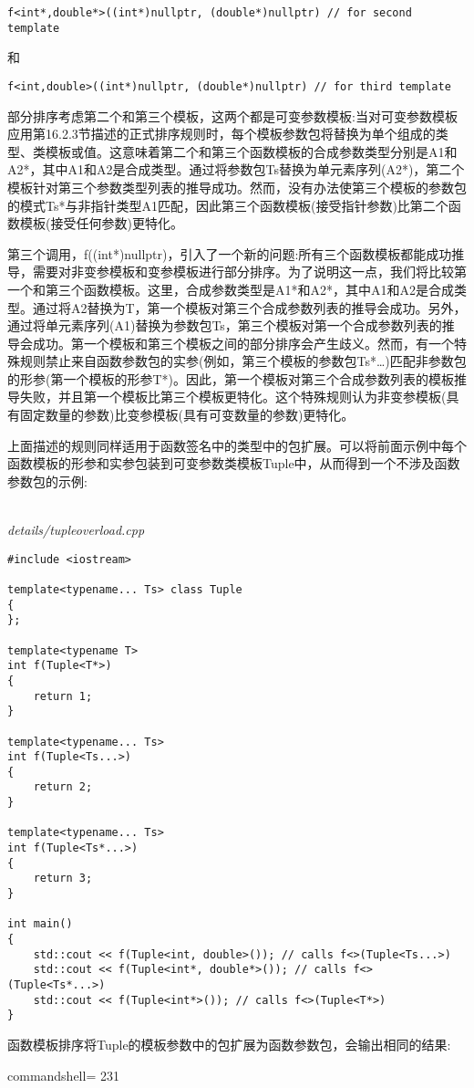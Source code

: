 \begin{lstlisting}[style=styleCXX]
f<int*,double*>((int*)nullptr, (double*)nullptr) // for second template
\end{lstlisting}

和

\begin{lstlisting}[style=styleCXX]
f<int,double>((int*)nullptr, (double*)nullptr) // for third template
\end{lstlisting}

部分排序考虑第二个和第三个模板，这两个都是可变参数模板:当对可变参数模板应用第16.2.3节描述的正式排序规则时，每个模板参数包将替换为单个组成的类型、类模板或值。这意味着第二个和第三个函数模板的合成参数类型分别是A1和A2*，其中A1和A2是合成类型。通过将参数包Ts替换为单元素序列(A2*)，第二个模板针对第三个参数类型列表的推导成功。然而，没有办法使第三个模板的参数包的模式Ts*与非指针类型A1匹配，因此第三个函数模板(接受指针参数)比第二个函数模板(接受任何参数)更特化。

第三个调用，f((int*)nullptr)，引入了一个新的问题:所有三个函数模板都能成功推导，需要对非变参模板和变参模板进行部分排序。为了说明这一点，我们将比较第一个和第三个函数模板。这里，合成参数类型是A1*和A2*，其中A1和A2是合成类型。通过将A2替换为T，第一个模板对第三个合成参数列表的推导会成功。另外，通过将单元素序列(A1)替换为参数包Ts，第三个模板对第一个合成参数列表的推导会成功。第一个模板和第三个模板之间的部分排序会产生歧义。然而，有一个特殊规则禁止来自函数参数包的实参(例如，第三个模板的参数包Ts*…)匹配非参数包的形参(第一个模板的形参T*)。因此，第一个模板对第三个合成参数列表的模板推导失败，并且第一个模板比第三个模板更特化。这个特殊规则认为非变参模板(具有固定数量的参数)比变参模板(具有可变数量的参数)更特化。

上面描述的规则同样适用于函数签名中的类型中的包扩展。可以将前面示例中每个函数模板的形参和实参包装到可变参数类模板Tuple中，从而得到一个不涉及函数参数包的示例:

\hspace*{\fill} \\ %
\noindent
\textit{details/tupleoverload.cpp}
\begin{lstlisting}[style=styleCXX]
#include <iostream>

template<typename... Ts> class Tuple
{
};

template<typename T>
int f(Tuple<T*>)
{
	return 1;
}

template<typename... Ts>
int f(Tuple<Ts...>)
{
	return 2;
}

template<typename... Ts>
int f(Tuple<Ts*...>)
{
	return 3;
}

int main()
{
	std::cout << f(Tuple<int, double>()); // calls f<>(Tuple<Ts...>)
	std::cout << f(Tuple<int*, double*>()); // calls f<>(Tuple<Ts*...>)
	std::cout << f(Tuple<int*>()); // calls f<>(Tuple<T*>)
}
\end{lstlisting}

函数模板排序将Tuple的模板参数中的包扩展为函数参数包，会输出相同的结果:

\begin{tcblisting}{commandshell={}}
231
\end{tcblisting}





















